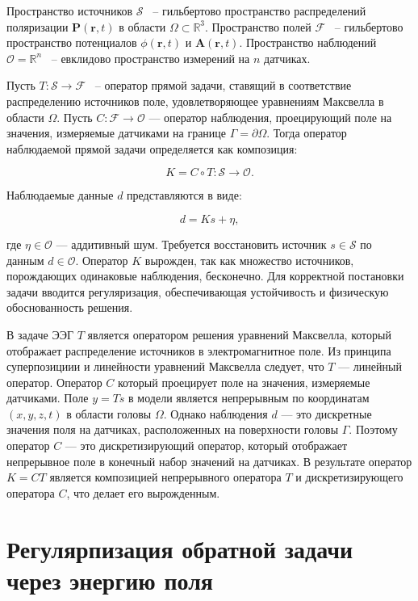 \documentclass[sn-mathphys-num]{bst/sn-jnl}
\theoremstyle{thmstylethree}
\theoremstyle{thmstyletwo}
\theoremstyle{thmstyleone}
\begin{document}
Пространство источников $\mathcal{S}$ ~-- гильбертово пространство распределений поляризации $\mathbf{P}(\mathbf{r}, t)$ в области $\Omega \subset \mathbb{R}^3$.
Пространство полей $\mathcal{F}$ ~-- гильбертово пространство потенциалов $\phi(\mathbf{r}, t)$ и $\mathbf{A}(\mathbf{r}, t)$.
Пространство наблюдений $\mathcal{O} = \mathbb{R}^n$ ~-- евклидово пространство измерений на $n$ датчиках.

Пусть $T: \mathcal{S} \to \mathcal{F}$ ~-- оператор прямой задачи, ставящий в соответствие распределению источников поле, удовлетворяющее уравнениям Максвелла в области $\Omega$. Пусть $C: \mathcal{F} \to \mathcal{O}$ --- оператор наблюдения, проецирующий поле на значения, измеряемые датчиками на границе $\Gamma = \partial\Omega$. Тогда оператор наблюдаемой прямой задачи определяется как композиция:

\begin{equation}
    K = C \circ T: \mathcal{S} \to \mathcal{O}.
\end{equation}

Наблюдаемые данные $d$ представляются в виде:

\begin{equation}
    d = K s + \eta,
\end{equation}

где $\eta \in \mathcal{O}$ --- аддитивный шум. Требуется восстановить источник $s \in \mathcal{S}$ по данным $d \in \mathcal{O}$.
Оператор $K$ вырожден, так как множество источников, порождающих одинаковые наблюдения, бесконечно. Для корректной постановки задачи вводится регуляризация, обеспечивающая устойчивость и физическую обоснованность решения.

В задаче ЭЭГ $T$   является оператором решения уравнений Максвелла, который отображает распределение источников 
в электромагнитное поле. Из принципа суперпозициии и линейности уравнений Максвелла следует, что $T$ — линейный оператор.
Оператор $C$ который проецирует поле на значения, измеряемые датчиками. 
Поле $y=T s$ в модели является непрерывным по координатам $(x,y,z,t)$ в области головы $\Omega$. 
Однако наблюдения $d$ — это дискретные значения поля на датчиках, расположенных на поверхности головы $\Gamma$. 
Поэтому оператор $C$ — это дискретизирующий оператор, который отображает непрерывное поле в конечный набор значений на датчиках. 
В результате оператор $K=C T$ является композицией непрерывного оператора $T$ и дискретизирующего оператора $C$, 
что делает его вырожденным.

\section{Регулярпизация обратной задачи через энергию поля}
\end{document}
